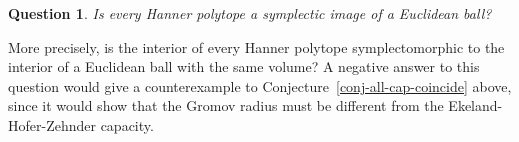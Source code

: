 \documentclass{icmart}
\newtheorem{question}[theorem]{Question}
\theoremstyle{definition}
\begin{document}
%
\begin{question} Is every Hanner polytope a symplectic image of a Euclidean ball?
\end{question}
More precisely, is the interior of every Hanner polytope  symplectomorphic to the interior of a Euclidean ball with the same volume?
A negative answer to this question would give a counterexample to Conjecture~\ref{conj-all-cap-coincide} above, since it would show that the Gromov radius must be different from the Ekeland-Hofer-Zehnder capacity. 

%

%

\bigskip
\end{document}
